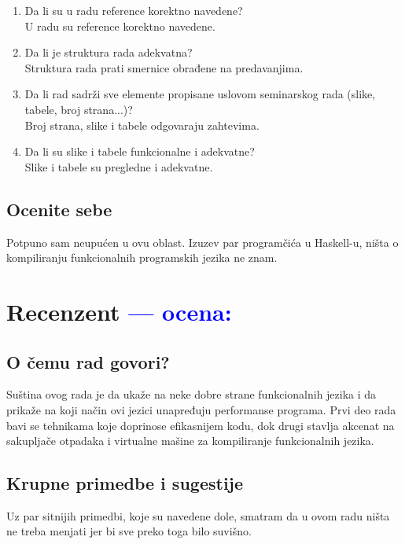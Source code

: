 \documentclass[a4paper]{report}
\newcommand{\odgovor}[1]{\textcolor{blue}{#1}}
\begin{document}
\begin{enumerate}
\item Da li su u radu reference korektno navedene?\\
U radu su reference korektno navedene.
\item Da li je struktura rada adekvatna?\\
Struktura rada prati smernice obrađene na predavanjima.
\item Da li rad sadrži sve elemente propisane uslovom seminarskog rada (slike, tabele, broj strana...)?\\
Broj strana, slike i tabele odgovaraju zahtevima.
\item Da li su slike i tabele funkcionalne i adekvatne?\\
Slike i tabele su pregledne i adekvatne.
\end{enumerate}

\section{Ocenite sebe}
Potpuno sam neupućen u ovu oblast. Izuzev par programčića u Haskell-u, ništa o kompiliranju funkcionalnih programskih jezika ne znam.

\chapter{Recenzent \odgovor{--- ocena:} }


\section{O čemu rad govori?}
Suština ovog rada je da ukaže na neke dobre strane funkcionalnih jezika i da prikaže na koji način ovi jezici unapređuju performanse programa.
Prvi deo rada bavi se tehnikama koje doprinose efikasnijem kodu, dok drugi stavlja akcenat na sakupljače otpadaka i virtualne mašine za kompiliranje funkcionalnih jezika. 

\section{Krupne primedbe i sugestije}
Uz par sitnijih primedbi, koje su navedene dole, smatram da u ovom radu ništa ne treba menjati jer bi sve preko toga bilo suvišno.
\end{document}

